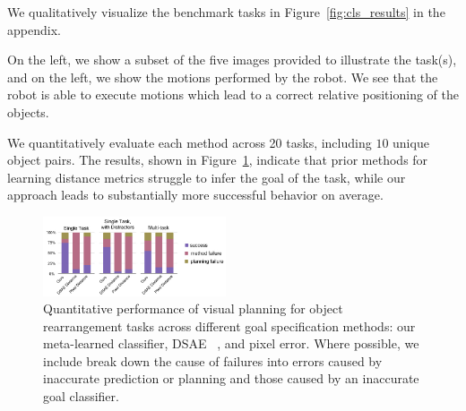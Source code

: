 We qualitatively visualize the benchmark tasks in Figure~\ref{fig:cls_results} in the appendix.

On the left, we show a subset of the five images provided to illustrate the task(s), and on the left, we show the motions performed by the robot. We see that the robot is able to execute motions which lead to a correct relative positioning of the objects. 

We quantitatively evaluate each method across 20 tasks, including $10$ unique object pairs. The results, shown in Figure~\ref{fig:cls_charts}, indicate that prior methods for learning distance metrics
struggle to infer the goal of the task, while our approach leads to substantially more successful behavior on average. 



\begin{figure}
    \centering
    \includegraphics[width=0.48\textwidth]{images_cls/cls_charts.jpeg}
    \caption{\small Quantitative performance of visual planning for object rearrangement tasks across different goal specification methods: our meta-learned classifier, DSAE~\cite{finn_nips} , and pixel error. Where possible, we include break down the cause of failures into errors caused by inaccurate prediction or planning and those caused by an inaccurate goal classifier.}
    \label{fig:cls_charts}
    \vspace{-0.3cm}
\end{figure}


